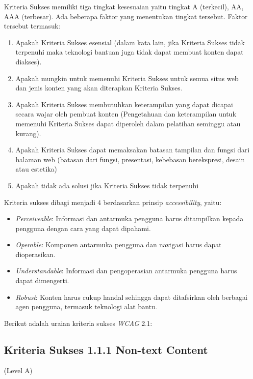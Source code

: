 Kriteria Sukses memiliki tiga tingkat kesesuaian yaitu tingkat A (terkecil), AA, AAA (terbesar). Ada beberapa faktor yang menentukan tingkat tersebut. Faktor tersebut termasuk:

\begin{enumerate}
	\item Apakah Kriteria Sukses esensial (dalam kata lain, jika Kriteria Sukses tidak terpenuhi maka teknologi bantuan juga tidak dapat membuat konten dapat diakses).
	\item Apakah mungkin untuk memenuhi Kriteria Sukses untuk semua situs web dan jenis konten yang akan diterapkan Kriteria Sukses.
	\item Apakah Kriteria Sukses membutuhkan keterampilan yang dapat dicapai secara wajar oleh pembuat konten (Pengetahuan dan keterampilan untuk memenuhi Kriteria Sukses dapat diperoleh dalam pelatihan seminggu atau kurang).
	\item Apakah Kriteria Sukses dapat memaksakan batasan tampilan dan fungsi dari halaman web (batasan dari fungsi, presentasi, kebebasan berekspresi, desain atau estetika)
	\item Apakah tidak ada solusi jika Kriteria Sukses tidak terpenuhi
\end{enumerate}

Kriteria sukses dibagi menjadi 4 berdasarkan prinsip \textit{accessibility}, yaitu:
\begin{itemize}
	\item \textit{Perceiveable}: Informasi dan antarmuka pengguna harus ditampilkan kepada pengguna dengan cara yang dapat dipahami.
	\item \textit{Operable}: Komponen antarmuka pengguna dan navigasi harus dapat dioperasikan.
	\item \textit{Understandable}: Informasi dan pengoperasian antarmuka pengguna harus dapat dimengerti.
	\item \textit{Robust}: Konten harus cukup handal sehingga dapat ditafsirkan oleh berbagai agen pengguna, termasuk teknologi alat bantu.
\end{itemize}

Berikut adalah uraian kriteria sukses \textit{WCAG} 2.1:

\subsection{Kriteria Sukses 1.1.1 Non-text Content}
\label{subsec:kriteria_1.1.1}
(Level A)\\

